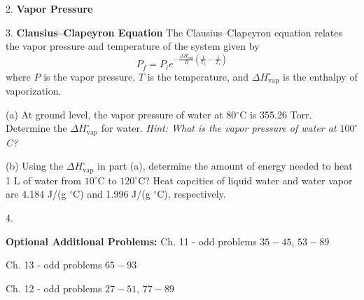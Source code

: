 \documentclass[11pt]{article}
\begin{document}
\pagebreak

2. \textbf{Vapor Pressure}

3. \textbf{Clausius--Clapeyron Equation} The Clausius--Clapeyron equation
relates the vapor pressure and temperature of the system given by
\begin{equation}
  P_f = P_i e^{-\frac{\Delta H^\circ_\text{vap}}{R}(\frac{1}{T_2}-\frac{1}{T_1})}
\end{equation}
where $P$ is the vapor pressure, $T$ is the temperature, and $\Delta H^\circ_\text{vap}$
is the enthalpy of vaporization.

(a) At ground level, the vapor pressure of water at 80$^\circ$C is 355.26 Torr.
Determine the $\Delta H^\circ_\text{vap}$ for water. \textit{Hint: What is the
  vapor pressure of water at $100^\circ$C?}

(b) Using the $\Delta H^\circ_\text{vap}$ in part (a), determine the amount of energy
needed to heat 1 L of water from $10^\circ$C to $120^\circ$C? Heat capcities of liquid
water and water vapor are 4.184 J/(g $^\circ$C) and 1.996 J/(g $^\circ$C), respectively.

\vspace{3in}

4. 

\vfill
\textbf{Optional Additional Problems:} Ch. 11 - odd problems $35 - 45$,
$53 - 89$

Ch. 13 - odd problems $65 - 93$

Ch. 12 - odd problems $27 - 51$, $77 - 89$
\end{document}
